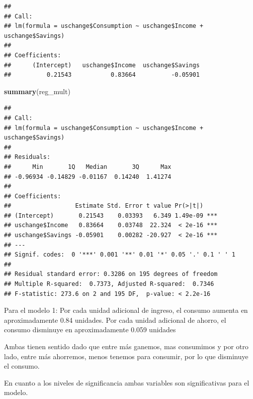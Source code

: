 \documentclass[
]{article}
\newenvironment{Shaded}{\begin{snugshade}}{\end{snugshade}}
\newcommand{\CommentTok}[1]{\textcolor[rgb]{0.56,0.35,0.01}{\textit{#1}}}
\newcommand{\FunctionTok}[1]{\textcolor[rgb]{0.13,0.29,0.53}{\textbf{#1}}}
\newcommand{\NormalTok}[1]{#1}
\begin{document}
\begin{verbatim}
## 
## Call:
## lm(formula = uschange$Consumption ~ uschange$Income + uschange$Savings)
## 
## Coefficients:
##      (Intercept)   uschange$Income  uschange$Savings  
##          0.21543           0.83664          -0.05901
\end{verbatim}

\begin{Shaded}
\begin{Highlighting}[]
\FunctionTok{summary}\NormalTok{(reg\_mult)}
\end{Highlighting}
\end{Shaded}

\begin{verbatim}
## 
## Call:
## lm(formula = uschange$Consumption ~ uschange$Income + uschange$Savings)
## 
## Residuals:
##      Min       1Q   Median       3Q      Max 
## -0.96934 -0.14829 -0.01167  0.14240  1.41274 
## 
## Coefficients:
##                  Estimate Std. Error t value Pr(>|t|)    
## (Intercept)       0.21543    0.03393   6.349 1.49e-09 ***
## uschange$Income   0.83664    0.03748  22.324  < 2e-16 ***
## uschange$Savings -0.05901    0.00282 -20.927  < 2e-16 ***
## ---
## Signif. codes:  0 '***' 0.001 '**' 0.01 '*' 0.05 '.' 0.1 ' ' 1
## 
## Residual standard error: 0.3286 on 195 degrees of freedom
## Multiple R-squared:  0.7373, Adjusted R-squared:  0.7346 
## F-statistic: 273.6 on 2 and 195 DF,  p-value: < 2.2e-16
\end{verbatim}

\begin{Shaded}
\end{Shaded}

Para el modelo 1: Por cada unidad adicional de ingreso, el consumo
aumenta en aproximadamente 0.84 unidades. Por cada unidad adicional de
ahorro, el consumo disminuye en aproximadamente 0.059 unidades

Ambas tienen sentido dado que entre más ganemos, mas consumimos y por
otro lado, entre más ahorremos, menos tenemos para consumir, por lo que
disminuye el consumo.

En cuanto a los niveles de significancia ambas variables son
significativas para el modelo.
\end{document}
